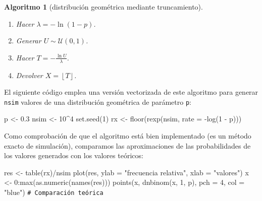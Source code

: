\documentclass[
  10pt,
]{book}
\newenvironment{Shaded}{\begin{snugshade}}{\end{snugshade}}
\newcommand{\AttributeTok}[1]{\textcolor[rgb]{0.77,0.63,0.00}{#1}}
\newcommand{\CommentTok}[1]{\textcolor[rgb]{0.56,0.35,0.01}{\textit{#1}}}
\newcommand{\DecValTok}[1]{\textcolor[rgb]{0.00,0.00,0.81}{#1}}
\newcommand{\FloatTok}[1]{\textcolor[rgb]{0.00,0.00,0.81}{#1}}
\newcommand{\FunctionTok}[1]{\textcolor[rgb]{0.00,0.00,0.00}{#1}}
\newcommand{\NormalTok}[1]{#1}
\newcommand{\OtherTok}[1]{\textcolor[rgb]{0.56,0.35,0.01}{#1}}
\newcommand{\SpecialCharTok}[1]{\textcolor[rgb]{0.00,0.00,0.00}{#1}}
\newcommand{\StringTok}[1]{\textcolor[rgb]{0.31,0.60,0.02}{#1}}
\theoremstyle{break}
\newtheorem{conjecture}{Algoritmo}[chapter]
\theoremstyle{nonumberplain}
\renewcommand{\CommentTok}[1]{\textcolor[rgb]{0.41,0.41,0.41}{\texttt{#1}}}
\begin{document}
\begin{conjecture}[distribución geométrica mediante truncamiento]
\protect\hypertarget{cnj:geometrica}{}\label{cnj:geometrica}

\begin{enumerate}
\def\labelenumi{\arabic{enumi}.}
\setcounter{enumi}{-1}
\item
  Hacer \(\lambda = -\ln(1 - p)\).
\item
  Generar \(U \sim \mathcal{U}(0, 1)\).
\item
  Hacer \(T = -\frac{\ln U}{\lambda}\).
\item
  Devolver \(X = \left\lfloor T \right\rfloor\).
\end{enumerate}

\end{conjecture}

El siguiente código emplea una versión vectorizada de este algoritmo para generar \texttt{nsim} valores de una distribución geométrica de parámetro \texttt{p}:

\begin{Shaded}
\begin{Highlighting}[]
\NormalTok{p }\OtherTok{\textless{}{-}} \FloatTok{0.3}
\NormalTok{nsim }\OtherTok{\textless{}{-}} \DecValTok{10}\SpecialCharTok{\^{}}\DecValTok{4}
\FunctionTok{set.seed}\NormalTok{(}\DecValTok{1}\NormalTok{)}
\NormalTok{rx }\OtherTok{\textless{}{-}} \FunctionTok{floor}\NormalTok{(}\FunctionTok{rexp}\NormalTok{(nsim, }\AttributeTok{rate =} \SpecialCharTok{{-}}\FunctionTok{log}\NormalTok{(}\DecValTok{1} \SpecialCharTok{{-}}\NormalTok{ p)))}
\end{Highlighting}
\end{Shaded}

Como comprobación de que el algoritmo está bien implementado (es un método exacto de simulación), comparamos las aproximaciones de las probabilidades de los valores generados con los valores teóricos:

\begin{Shaded}
\begin{Highlighting}[]
\NormalTok{res }\OtherTok{\textless{}{-}} \FunctionTok{table}\NormalTok{(rx)}\SpecialCharTok{/}\NormalTok{nsim}
\FunctionTok{plot}\NormalTok{(res, }\AttributeTok{ylab =} \StringTok{"frecuencia relativa"}\NormalTok{, }\AttributeTok{xlab =} \StringTok{"valores"}\NormalTok{)}
\NormalTok{x }\OtherTok{\textless{}{-}} \DecValTok{0}\SpecialCharTok{:}\FunctionTok{max}\NormalTok{(}\FunctionTok{as.numeric}\NormalTok{(}\FunctionTok{names}\NormalTok{(res)))}
\FunctionTok{points}\NormalTok{(x, }\FunctionTok{dnbinom}\NormalTok{(x, }\DecValTok{1}\NormalTok{, p), }\AttributeTok{pch =} \DecValTok{4}\NormalTok{, }\AttributeTok{col =} \StringTok{"blue"}\NormalTok{)  }\CommentTok{\# Comparación teórica}
\end{Highlighting}
\end{Shaded}
\end{document}
